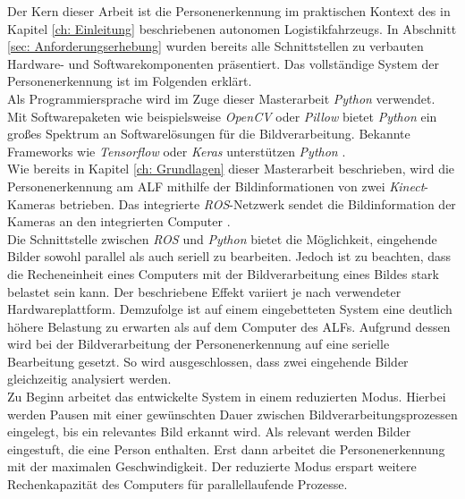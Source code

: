 	Der Kern dieser Arbeit ist die Personenerkennung im praktischen Kontext des in Kapitel \ref{ch: Einleitung} beschriebenen autonomen Logistikfahrzeugs. In Abschnitt \ref{sec: Anforderungserhebung} wurden bereits alle Schnittstellen zu verbauten Hardware- und Softwarekomponenten präsentiert. Das vollständige System der Personenerkennung ist im Folgenden erklärt.\\
	
 	Als Programmiersprache wird im Zuge dieser Masterarbeit \textit{Python} verwendet. Mit Softwarepaketen wie beispielsweise \textit{OpenCV} oder \textit{Pillow} bietet \textit{Python} ein großes Spektrum an Softwarelösungen für die Bildverarbeitung. Bekannte Frameworks wie \textit{Tensorflow} oder \textit{Keras} unterstützen \textit{Python} \cite{tensorflow, keraspython}.\\
	
	Wie bereits in Kapitel \ref{ch: Grundlagen} dieser Masterarbeit beschrieben, wird die Personenerkennung am ALF mithilfe der Bildinformationen von zwei \textit{Kinect}-Kameras betrieben.
	Das integrierte \textit{ROS}-Netzwerk sendet die Bildinformation der Kameras an den integrierten Computer \cite{Bachelorarbeit}.\\
	
	 Die Schnittstelle zwischen \textit{ROS} und \textit{Python} bietet die Möglichkeit, eingehende Bilder sowohl parallel als auch seriell zu bearbeiten. Jedoch ist zu beachten, dass die Recheneinheit eines Computers mit der Bildverarbeitung eines Bildes stark belastet sein kann. Der beschriebene Effekt variiert je nach verwendeter Hardwareplattform. Demzufolge ist auf einem eingebetteten System eine deutlich höhere Belastung zu erwarten als auf dem Computer des ALFs. Aufgrund dessen wird bei der Bildverarbeitung der Personenerkennung auf eine serielle Bearbeitung gesetzt. So wird ausgeschlossen, dass zwei eingehende Bilder gleichzeitig analysiert werden.\\
	

	Zu Beginn arbeitet das entwickelte System in einem reduzierten Modus. Hierbei werden Pausen mit einer gewünschten Dauer zwischen Bildverarbeitungsprozessen eingelegt, bis ein relevantes Bild erkannt wird. Als relevant werden Bilder eingestuft, die eine Person enthalten. Erst dann arbeitet die Personenerkennung mit der maximalen Geschwindigkeit. Der reduzierte Modus erspart weitere Rechenkapazität des Computers für parallellaufende Prozesse. \\
		


